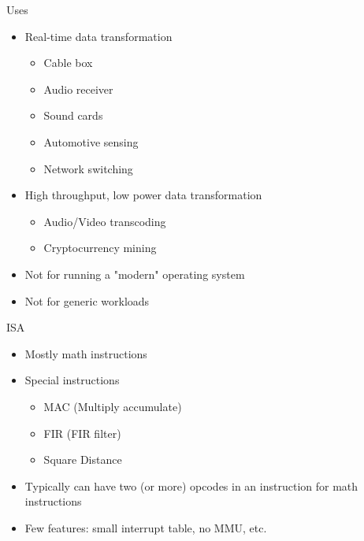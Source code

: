 \documentclass{beamer}
\begin{document}
\begin{frame}{Uses}
    \begin{itemize}
        \item Real-time data transformation
            \begin{itemize}
                \item Cable box
                \item Audio receiver
                \item Sound cards
                \item Automotive sensing
                \item Network switching
            \end{itemize}
        \item High throughput, low power data transformation
            \begin{itemize}
                \item Audio/Video transcoding
                \item Cryptocurrency mining
            \end{itemize}
        \item Not for running a "modern" operating system %
        \item Not for generic workloads %
    \end{itemize}
\end{frame}

\begin{frame}{ISA}
    \begin{itemize}
        \item Mostly math instructions
        \item Special instructions
            \begin{itemize}
                \item MAC (Multiply accumulate)
                \item FIR (FIR filter)
                \item Square Distance
            \end{itemize}
        \item Typically can have two (or more) opcodes in an instruction for
            math instructions
        \item Few features: small interrupt table, no MMU, etc.
    \end{itemize}
\end{frame}
\end{document}
